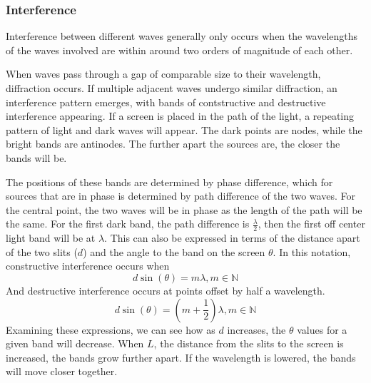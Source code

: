 \documentclass[12pt]{report}
\begin{document}
\begin{flushleft}
\subsubsection*{Interference}
Interference between different waves generally only occurs when the wavelengths
of the waves involved are within around two orders of magnitude of each other.

\bigskip
When waves pass through a gap of comparable size to their wavelength,
diffraction occurs. If multiple adjacent waves undergo similar diffraction, an
interference pattern emerges, with bands of contstructive and destructive
interference appearing. If a screen is placed in the path of the light, a
repeating pattern of light and dark waves will appear. The dark points are
nodes, while the bright bands are antinodes. The further apart the sources are,
the closer the bands will be.

\bigskip
The positions of these bands are determined by phase difference, which for
sources that are in phase is determined by path difference of the two waves.
For the central point, the two waves will be in phase as the length of the path
will be the same. For the first dark band, the path difference is 
\(\frac{\lambda}{2}\), then the first off center light band will be at 
\(\lambda\). This can also be expressed in terms of the distance apart of the
two slits (\(d\)) and the angle to the band on the screen \(\theta\). In this
notation, constructive interference occurs when
\[d\sin(\theta) = m\lambda, m \in \mathbb{N}\]
And destructive interference occurs at points offset by half a wavelength.
\[d\sin(\theta) = \left(m + \frac{1}{2}\right)\lambda, m \in \mathbb{N}\]
Examining these expressions, we can see how as \(d\) increases, the \(\theta\)
values for a given band will decrease. When \(L\), the distance from the slits
to the screen is increased, the bands grow further apart. If the wavelength is
lowered, the bands will move closer together.


\end{flushleft}
\end{document}
